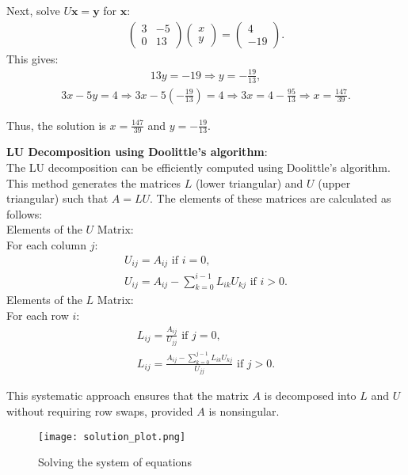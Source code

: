 \documentclass[journal]{IEEEtran}
\begin{document}
Next, solve $U \mathbf{x} = \mathbf{y}$ for $\mathbf{x}$:  
\begin{align}  
\begin{pmatrix} 3 & -5 \\ 0 & 13 \end{pmatrix} \begin{pmatrix} x \\ y \end{pmatrix} = \begin{pmatrix} 4 \\ -19 \end{pmatrix}.  
\end{align}  
This gives:  
\begin{align}  
13y = -19 \Rightarrow y = -\frac{19}{13},  
\end{align}  
\begin{align}  
3x - 5y = 4 \Rightarrow 3x - 5\left(-\frac{19}{13}\right) = 4 \Rightarrow 3x = 4 - \frac{95}{13} \Rightarrow x = \frac{147}{39}.  
\end{align}  

Thus, the solution is $x = \frac{147}{39}$ and $y = -\frac{19}{13}$.  

\textbf{LU Decomposition using Doolittle's algorithm}:  \\
The LU decomposition can be efficiently computed using Doolittle's algorithm. This method generates the matrices $L$ (lower triangular) and $U$ (upper triangular) such that $A = LU$. The elements of these matrices are calculated as follows: \\  
Elements of the $U$ Matrix: \\  
For each column $j$:  
\begin{align}  
U_{ij} = A_{ij} \text{ if } i = 0, \\  
U_{ij} = A_{ij} - \sum_{k=0}^{i-1} L_{ik} U_{kj} \text{ if } i > 0.  
\end{align}  
Elements of the $L$ Matrix: \\  
For each row $i$:  
\begin{align}  
L_{ij} = \frac{A_{ij}}{U_{jj}} \text{ if } j = 0, \\  
L_{ij} = \frac{A_{ij} - \sum_{k=0}^{j-1} L_{ik} U_{kj}}{U_{jj}} \text{ if } j > 0.  
\end{align}  

This systematic approach ensures that the matrix $A$ is decomposed into $L$ and $U$ without requiring row swaps, provided $A$ is nonsingular.  
\begin{figure}[h!]
   \centering
   \texttt{[image: solution\_plot.png]}
   \caption{Solving the system of equations}
   \label{stemplot}
\end{figure}
\end{document}
